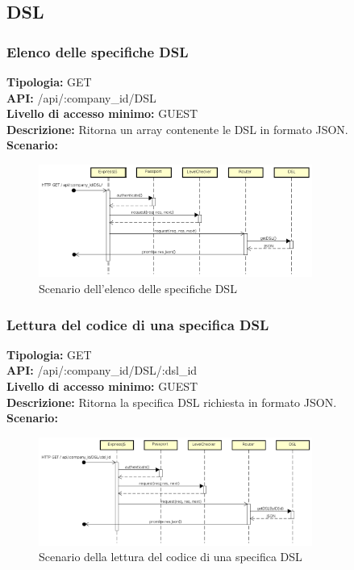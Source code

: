 \newpage
\subsection{DSL}
\subsubsection{Elenco delle specifiche DSL}
\textbf{Tipologia:} GET \\
\textbf{API:} /api/:company\_id/DSL \\
\textbf{Livello di accesso minimo:} GUEST \\
\textbf{Descrizione:} Ritorna un array contenente le DSL in formato JSON. \\
\textbf{Scenario:} 
\begin{figure}[h]
\centering
\includegraphics[width=0.8\textwidth]{res/sections/backend/(GET)dsl.png}
\caption{Scenario dell'elenco delle specifiche DSL}
\end{figure}

\newpage
\subsubsection{Lettura del codice di una specifica DSL}
\textbf{Tipologia:} GET \\
\textbf{API:} /api/:company\_id/DSL/:dsl\_id \\
\textbf{Livello di accesso minimo:} GUEST \\
\textbf{Descrizione:} Ritorna la specifica DSL richiesta in formato JSON. \\
\textbf{Scenario:} 
\begin{figure}[h]
\centering
\includegraphics[width=0.8\textwidth]{res/sections/backend/(GET)dslByID.png}
\caption{Scenario della lettura del codice di una specifica DSL}
\end{figure}

